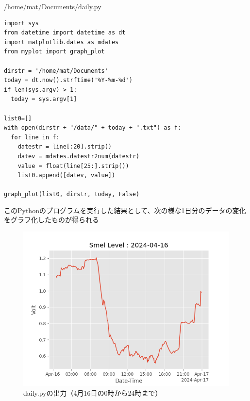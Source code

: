 \documentclass[12pt,a4paper,uplatex]{jsbook}
\begin{document}
\begin{itembox}[l]{/home/mat/Documents/daily.py}
	\begin{verbatim}
import sys
from datetime import datetime as dt
import matplotlib.dates as mdates
from myplot import graph_plot

dirstr = '/home/mat/Documents'
today = dt.now().strftime('%Y-%m-%d')
if len(sys.argv) > 1:
  today = sys.argv[1]

list0=[]
with open(dirstr + "/data/" + today + ".txt") as f:
  for line in f:
    datestr = line[:20].strip()
    datev = mdates.datestr2num(datestr)
    value = float(line[25:].strip())
    list0.append([datev, value])

graph_plot(list0, dirstr, today, False)
	\end{verbatim}
\end{itembox}

\newpage

このPythonのプログラムを実行した結果として、次の様な1日分のデータの変化をグラフ化したものが得られる%

\begin{figure}[htbp]
	\begin{minipage}[b]{1.0\linewidth}
		\centering
		\includegraphics[keepaspectratio, scale=0.8]{figs/png/2024-04-16.png}
		\caption{daily.pyの出力（4月16日の0時から24時まで）}
	\end{minipage}
\end{figure}
\end{document}
